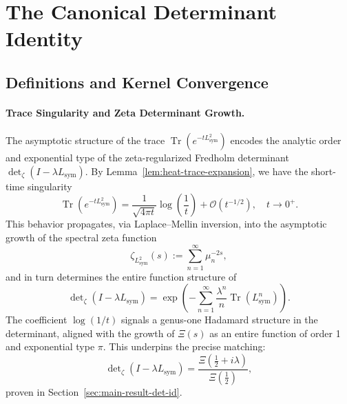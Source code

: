 \section{The Canonical Determinant Identity}
\label{sec:determinant_identity}



\subsection{Definitions and Kernel Convergence}









\paragraph{Trace Singularity and Zeta Determinant Growth.}
The asymptotic structure of the trace \(\operatorname{Tr}(e^{-tL^2_{\mathrm{sym}}})\) encodes the analytic order and exponential type of the zeta-regularized Fredholm determinant \(\det\nolimits_{\zeta}(I - \lambda L_{\mathrm{sym}})\). By Lemma~\ref{lem:heat-trace-expansion}, we have the short-time singularity
\[
\operatorname{Tr}(e^{-tL^2_{\mathrm{sym}}}) = \frac{1}{\sqrt{4\pi t}} \log\left(\frac{1}{t}\right) + \mathcal{O}(t^{-1/2}),
\quad t \to 0^+.
\]
This behavior propagates, via Laplace–Mellin inversion, into the asymptotic growth of the spectral zeta function
\[
\zeta_{L^2_{\mathrm{sym}}}(s) := \sum_{n=1}^\infty \mu_n^{-2s},
\]
and in turn determines the entire function structure of
\[
\det\nolimits_{\zeta}(I - \lambda L_{\mathrm{sym}}) = \exp\left(- \sum_{n=1}^\infty \frac{\lambda^n}{n} \operatorname{Tr}(L_{\mathrm{sym}}^n)\right).
\]
The coefficient \(\log(1/t)\) signals a genus-one Hadamard structure in the determinant, aligned with the growth of \(\Xi(s)\) as an entire function of order 1 and exponential type \(\pi\). This underpins the precise matching:
\[
\det\nolimits_{\zeta}(I - \lambda L_{\mathrm{sym}}) = \frac{\Xi(\tfrac{1}{2} + i\lambda)}{\Xi(\tfrac{1}{2})},
\]
proven in Section~\ref{sec:main-result-det-id}.

